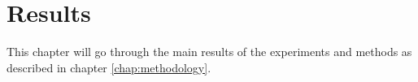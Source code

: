 \chapter{Results}
\label{chap:results}
This chapter will go through the main results of the experiments and methods as described in chapter \ref{chap:methodology}. 




